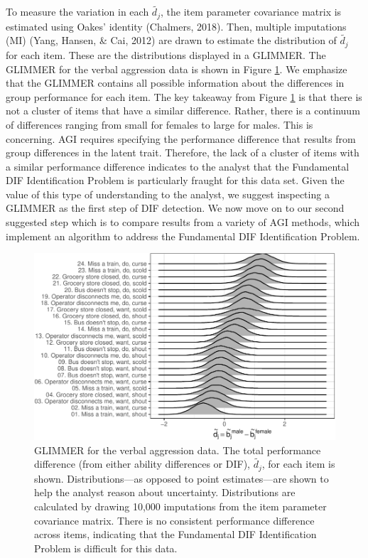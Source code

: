 \documentclass[
  english,
  man,floatsintext]{apa6}
\begin{document}
To measure the variation in each \(\tilde{{d_j}}\), the item parameter covariance matrix is estimated using Oakes' identity (Chalmers, 2018). Then, multiple imputations (MI) (Yang, Hansen, \& Cai, 2012) are drawn to estimate the distribution of \(\tilde{d_j}\) for each item. These are the distributions displayed in a GLIMMER. The GLIMMER for the verbal aggression data is shown in Figure \ref{fig:emmilg}. We emphasize that the GLIMMER contains all possible information about the differences in group performance for each item. The key takeaway from Figure \ref{fig:emmilg} is that there is not a cluster of items that have a similar difference. Rather, there is a continuum of differences ranging from small for females to large for males. This is concerning. AGI requires specifying the performance difference that results from group differences in the latent trait. Therefore, the lack of a cluster of items with a similar performance difference indicates to the analyst that the Fundamental DIF Identification Problem is particularly fraught for this data set. Given the value of this type of understanding to the analyst, we suggest inspecting a GLIMMER as the first step of DIF detection. We now move on to our second suggested step which is to compare results from a variety of AGI methods, which implement an algorithm to address the Fundamental DIF Identification Problem.

\begin{figure}[H]

{\centering \includegraphics{paper_apa_files/figure-latex/emmilg-1} 

}

\caption{GLIMMER for the verbal aggression data. The total performance difference (from either ability differences or DIF), $\tilde{{d_j}}$, for each item is shown. Distributions—as opposed to point estimates—are shown to help the analyst reason about uncertainty. Distributions are calculated by drawing 10,000 imputations from the item parameter covariance matrix. There is no consistent performance difference across items, indicating that the Fundamental DIF Identification Problem is difficult for this data.}\label{fig:emmilg}
\end{figure}
\end{document}
